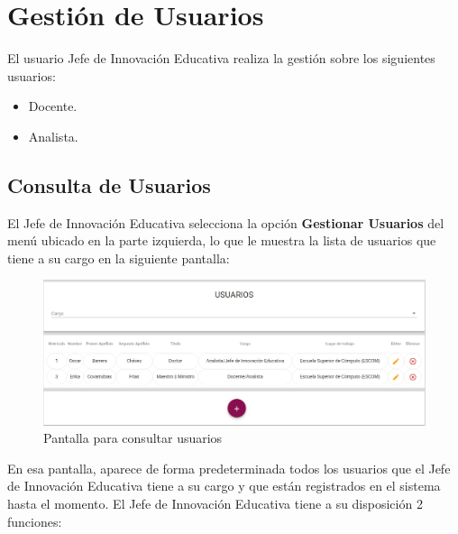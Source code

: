 \clearpage
\section{Gestión de Usuarios}

    El usuario  Jefe de Innovación Educativa realiza la gestión sobre los siguientes usuarios:
    \begin{itemize}
        \item Docente.
        \item Analista.
    \end{itemize}
  \subsection{Consulta de Usuarios}

El Jefe de Innovación Educativa selecciona  la opción \textbf{Gestionar Usuarios} del menú ubicado en la parte izquierda, lo que le muestra la lista de usuarios que tiene a su cargo en la siguiente pantalla:

\begin{figure}[H]
	\centering
	\hypertarget{consultarUs}{\includegraphics[width=0.6\linewidth]{images/SP5/Consultar-Usuario}}
	\caption{Pantalla para consultar usuarios}
	\label{consultarrh}
\end{figure}

En esa pantalla, aparece de forma predeterminada todos los usuarios que el Jefe de Innovación Educativa tiene a su cargo y que están registrados en el sistema hasta el momento. El Jefe de Innovación Educativa tiene a su disposición 2 funciones:

